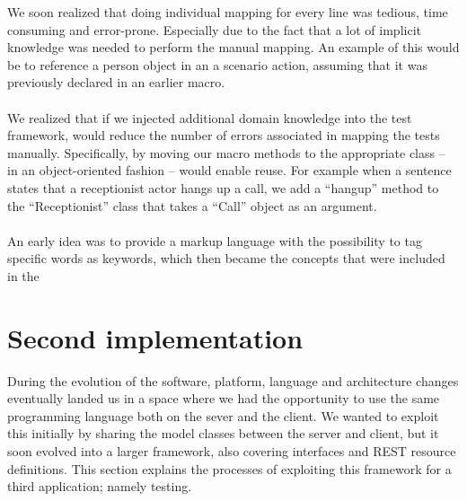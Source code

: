 We soon realized that doing individual mapping for every line was tedious, time consuming and error-prone. Especially due to the fact that a lot of implicit knowledge was needed to perform the manual mapping. An example of this would be to reference a person object in an a scenario action, assuming that it was previously declared in an earlier macro.\\\\
We realized that if we injected additional domain knowledge into the test framework, would reduce the number of errors associated in mapping the tests manually. Specifically, by moving our macro methods to the appropriate class -- in an object-oriented fashion -- would enable reuse. For example when a sentence states that a receptionist actor hangs up a call, we add a ``hangup'' method to the  ``Receptionist'' class that takes a ``Call'' object as an argument.\\\\
An early idea was to provide a markup language with the possibility to tag specific words as keywords, which then became the concepts that were included in the 


\section{Second implementation}
During the evolution of the software, platform, language and architecture changes eventually landed us in a space where we had the opportunity to use the same programming language both on the sever and the client. We wanted to exploit this initially by sharing the model classes between the server and client, but it soon evolved into a larger framework, also covering interfaces and REST resource definitions. This section explains the processes of exploiting this framework for a third application; namely testing.


